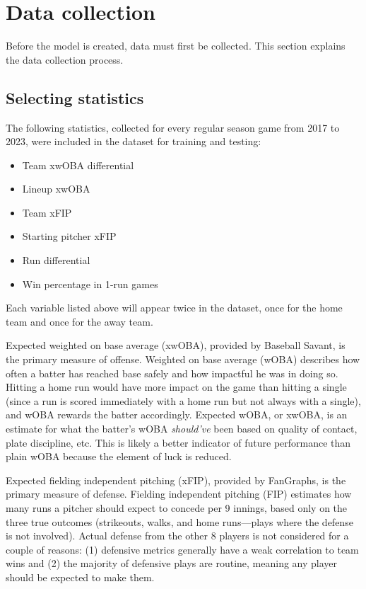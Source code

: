 \documentclass{paper}
\begin{document}
\section{Data collection}
Before the model is created, data must first be collected. This section explains the data collection process.

\subsection{Selecting statistics}
The following statistics, collected for every regular season game from 2017 to 2023, were included in the dataset for training and testing:

\begin{itemize}
\item Team xwOBA differential
\item Lineup xwOBA
\item Team xFIP
\item Starting pitcher xFIP
\item Run differential
\item Win percentage in 1-run games
\end{itemize}

Each variable listed above will appear twice in the dataset, once for the home team and once for the away team.

Expected weighted on base average (xwOBA), provided by Baseball Savant, is the primary measure of offense. Weighted on base average (wOBA) describes how often a batter has reached base safely and how impactful he was in doing so. Hitting a home run would have more impact on the game than hitting a single (since a run is scored immediately with a home run but not always with a single), and wOBA rewards the batter accordingly. Expected wOBA, or xwOBA, is an estimate for what the batter's wOBA \textit{should've} been based on quality of contact, plate discipline, etc. This is likely a better indicator of future performance than plain wOBA because the element of luck is reduced.

Expected fielding independent pitching (xFIP), provided by FanGraphs, is the primary measure of defense. Fielding independent pitching (FIP) estimates how many runs a pitcher should expect to concede per 9 innings, based only on the three true outcomes (strikeouts, walks, and home runs---plays where the defense is not involved). Actual defense from the other 8 players is not considered for a couple of reasons: (1) defensive metrics generally have a weak correlation to team wins and (2) the majority of defensive plays are routine, meaning any player should be expected to make them.
\end{document}
